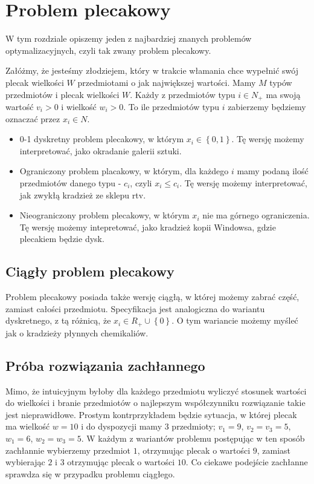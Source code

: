 \section{Problem plecakowy}

\label{sec:plecaki}

W tym rozdziale opiszemy jeden z najbardziej znanych problemów optymalizacyjnych, czyli tak zwany problem plecakowy.

Załóżmy, że jesteśmy złodziejem, który w trakcie włamania chce wypełnić swój plecak wielkości $W$ przedmiotami o jak największej wartości.
Mamy $M$ typów przedmiotów i plecak wielkości $W$.
Każdy z przedmiotów typu $i\in N_+$ ma swoją wartość $v_i> 0$ i wielkość $w_i> 0$.
To ile przedmiotów typu $i$ zabierzemy będziemy oznaczać przez $x_i\in N$.

\begin{itemize}
  \item 0-1 dyskretny problem plecakowy, w którym $x_i \in \left \{ 0, 1 \right \}$.
  Tę wersję możemy interpretować, jako okradanie galerii sztuki.
  \item Ograniczony problem placakowy, w którym, dla każdego $i$ mamy podaną ilość przedmiotów danego typu - $c_i$, czyli $x_i \leq c_i$.
  Tę wersję możemy interpretować, jak zwykłą kradzież ze sklepu rtv.
  \item Nieograniczony problem plecakowy, w którym $x_i$ nie ma górnego ograniczenia.
  Tę wersję możemy intepretować, jako kradzież kopii Windowsa, gdzie plecakiem będzie dysk.
\end{itemize}

\subsection{Ciągły problem plecakowy}
Problem plecakowy posiada także wersję ciągłą, w której możemy zabrać część, zamiast całości przedmiotu.
Specyfikacja jest analogiczna do wariantu dyskretnego, z tą różnicą, że $x_i \in R_+ \cup \left \{ 0 \right \}$.
O tym wariancie możemy myśleć jak o kradzieży płynnych chemikaliów.

\subsection{Próba rozwiązania zachłannego}
Mimo, że intuicyjnym byłoby dla każdego przedmiotu wyliczyć stosunek wartości do wielkości i branie przedmiotów
o najlepszym współczynniku rozwiązanie takie jest nieprawidłowe.
Prostym kontrprzykładem będzie sytuacja, w której plecak ma wielkość $w = 10$ i do dyspozycji mamy $3$ przedmioty;
$v_1=9$, $v_2=v_3=5$, $w_1=6$, $w_2=w_3=5$. W każdym z wariantów problemu postępując w ten sposób zachłannie wybierzemy przedmiot $1$,
otrzymując plecak o wartości $9$, zamiast wybierając $2$ i $3$ otrzymując plecak o wartości $10$.
Co ciekawe podejście zachłanne sprawdza się w przypadku problemu ciągłego.

